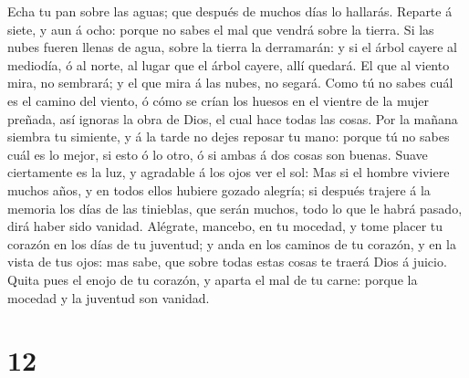  Echa tu pan sobre las aguas; que después de muchos días lo
hallarás.  Reparte á siete, y aun á ocho: porque no sabes el
mal que vendrá sobre la tierra.  Si las nubes fueren llenas
de agua, sobre la tierra la derramarán: y si el árbol cayere al
mediodía, ó al norte, al lugar que el árbol cayere, allí quedará.
 El que al viento mira, no sembrará; y el que mira á las
nubes, no segará.  Como tú no sabes cuál es el camino del
viento, ó cómo se crían los huesos en el vientre de la mujer preñada,
así ignoras la obra de Dios, el cual hace todas las cosas. 
Por la mañana siembra tu simiente, y á la tarde no dejes reposar tu
mano: porque tú no sabes cuál es lo mejor, si esto ó lo otro, ó si ambas
á dos cosas son buenas.  Suave ciertamente es la luz, y
agradable á los ojos ver el sol:  Mas si el hombre viviere
muchos años, y en todos ellos hubiere gozado alegría; si después trajere
á la memoria los días de las tinieblas, que serán muchos, todo lo que le
habrá pasado, dirá haber sido vanidad.  Alégrate, mancebo,
en tu mocedad, y tome placer tu corazón en los días de tu juventud; y
anda en los caminos de tu corazón, y en la vista de tus ojos: mas sabe,
que sobre todas estas cosas te traerá Dios á juicio.  Quita
pues el enojo de tu corazón, y aparta el mal de tu carne: porque la
mocedad y la juventud son vanidad.

\hypertarget{section-11}{%
\section{12}\label{section-11}}

